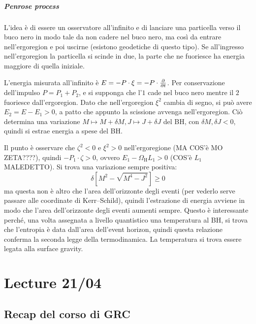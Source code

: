 \paragraph{Penrose process}

L'idea è di essere un osservatore all'infinito e di lanciare una particella verso il buco nero in modo tale da non cadere nel buco nero, ma così da entrare nell'ergoregion e poi uscirne (esistono geodetiche di questo tipo). Se all'ingresso nell'ergoregion la particella si scinde in due, la parte che ne fuoriesce ha energia maggiore di quella iniziale.

L'energia misurata all'infinito è $ E = - P \cdot \xi = - P \cdot \frac{\partial}{\partial t} $. Per conservazione dell'impulso $ P = P_1 + P_2 $, e si supponga che l'$ 1 $ cade nel buco nero mentre il $ 2 $ fuoriesce dall'ergoregion. Dato che nell'ergoregion $ \xi^2 $ cambia di segno, si può avere $ E_2 = E - E_1 > 0 $, a patto che appunto la scissione avvenga nell'ergoregion. Ciò determina una variazione $ M \mapsto M + \delta M , J \mapsto J + \delta J $ del BH, con $ \delta M , \delta J < 0 $, quindi si estrae energia a spese del BH.

Il punto è osservare che $ \zeta^2 < 0 $ e $ \xi^2 > 0 $ nell'ergoregione (MA COS'è MO ZETA????), quindi $ - P_1 \cdot \zeta > 0 $, ovvero $ E_1 - \Omega_\text{H} L_1 > 0 $ (COS'è $ L_1 $ MALEDETTO). Si trova una variazione sempre positiva:
\begin{equation*}
  \delta \left[ M^2 - \sqrt{M^4 - J^2} \right] \geq 0
\end{equation*}
ma questa non è altro che l'area dell'orizzonte degli eventi (per vederlo serve passare alle coordinate di Kerr--Schild), quindi l'estrazione di energia avviene in modo che l'area dell'orizzonte degli eventi aumenti sempre. Questo è interessante perché, una volta assegnata a livello quantistico una temperatura al BH, si trova che l'entropia è data dall'area dell'event horizon, quindi questa relazione conferma la seconda legge della termodinamica. La temperatura si trova essere legata alla surface gravity.


\chapter{Lecture 21/04}

\section{Recap del corso di GRC}

